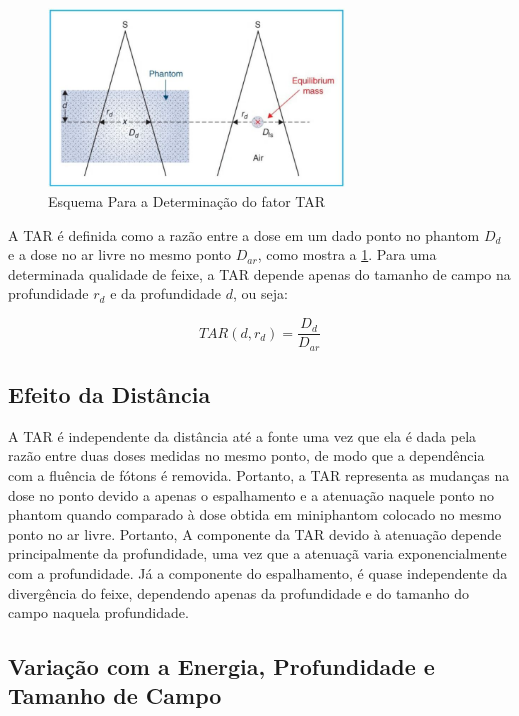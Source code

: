 \documentclass[11pt,a4paper]{article}
\begin{document}
	\begin{figure}[h]
		\centering
		\includegraphics[width=0.7\textwidth]{Imagens/esquemaTAR.JPG}
		\caption{Esquema Para a Determinação do fator TAR}
		\label{fig:esquemaTAR}
	\end{figure}

	A TAR é definida como a razão entre a dose em um dado ponto no phantom $D_d$ e a dose no ar livre no mesmo ponto $D_{ar}$, como mostra a \ref{fig:esquemaTAR}. Para uma determinada qualidade de feixe, a TAR depende apenas do tamanho de campo na profundidade $r_d$ e da profundidade $d$, ou seja:

		\begin{equation}
			TAR(d, r_d) = \frac{D_d}{D_{ar}}
		\end{equation}


	\subsection{Efeito da Distância}

	A TAR é independente da distância até a fonte uma vez que ela é dada pela razão entre duas doses medidas no mesmo ponto, de modo que a dependência com a fluência de fótons é removida. Portanto, a TAR representa as mudanças na dose no ponto devido a apenas o espalhamento e a atenuação naquele ponto no phantom quando comparado à dose obtida em  miniphantom colocado no mesmo ponto no ar livre. Portanto, A componente da TAR devido à atenuação depende principalmente da profundidade, uma vez que a atenuaçã varia exponencialmente com a profundidade. Já a componente do espalhamento, é quase independente da divergência do feixe, dependendo apenas da profundidade e do tamanho do campo naquela profundidade.

	\subsection{Variação com a Energia, Profundidade e Tamanho de Campo}
\end{document}

